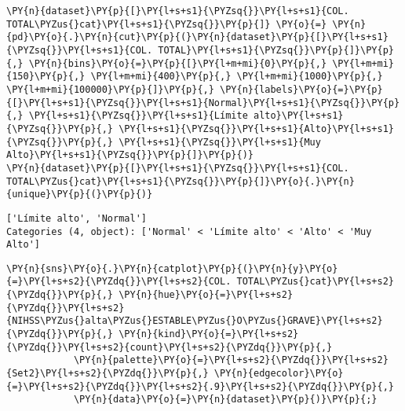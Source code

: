     \begin{tcolorbox}[breakable, size=fbox, boxrule=1pt, pad at break*=1mm,colback=cellbackground, colframe=cellborder]
\begin{Verbatim}[commandchars=\\\{\}]
\PY{n}{dataset}\PY{p}{[}\PY{l+s+s1}{\PYZsq{}}\PY{l+s+s1}{COL. TOTAL\PYZus{}cat}\PY{l+s+s1}{\PYZsq{}}\PY{p}{]} \PY{o}{=} \PY{n}{pd}\PY{o}{.}\PY{n}{cut}\PY{p}{(}\PY{n}{dataset}\PY{p}{[}\PY{l+s+s1}{\PYZsq{}}\PY{l+s+s1}{COL. TOTAL}\PY{l+s+s1}{\PYZsq{}}\PY{p}{]}\PY{p}{,} \PY{n}{bins}\PY{o}{=}\PY{p}{[}\PY{l+m+mi}{0}\PY{p}{,} \PY{l+m+mi}{150}\PY{p}{,} \PY{l+m+mi}{400}\PY{p}{,} \PY{l+m+mi}{1000}\PY{p}{,} \PY{l+m+mi}{100000}\PY{p}{]}\PY{p}{,} \PY{n}{labels}\PY{o}{=}\PY{p}{[}\PY{l+s+s1}{\PYZsq{}}\PY{l+s+s1}{Normal}\PY{l+s+s1}{\PYZsq{}}\PY{p}{,} \PY{l+s+s1}{\PYZsq{}}\PY{l+s+s1}{Límite alto}\PY{l+s+s1}{\PYZsq{}}\PY{p}{,} \PY{l+s+s1}{\PYZsq{}}\PY{l+s+s1}{Alto}\PY{l+s+s1}{\PYZsq{}}\PY{p}{,} \PY{l+s+s1}{\PYZsq{}}\PY{l+s+s1}{Muy Alto}\PY{l+s+s1}{\PYZsq{}}\PY{p}{]}\PY{p}{)}
\PY{n}{dataset}\PY{p}{[}\PY{l+s+s1}{\PYZsq{}}\PY{l+s+s1}{COL. TOTAL\PYZus{}cat}\PY{l+s+s1}{\PYZsq{}}\PY{p}{]}\PY{o}{.}\PY{n}{unique}\PY{p}{(}\PY{p}{)}
\end{Verbatim}
\end{tcolorbox}

            \begin{tcolorbox}[breakable, size=fbox, boxrule=.5pt, pad at break*=1mm, opacityfill=0]
\begin{Verbatim}[commandchars=\\\{\}]
['Límite alto', 'Normal']
Categories (4, object): ['Normal' < 'Límite alto' < 'Alto' < 'Muy Alto']
\end{Verbatim}
\end{tcolorbox}
        
    \begin{tcolorbox}[breakable, size=fbox, boxrule=1pt, pad at break*=1mm,colback=cellbackground, colframe=cellborder]
\begin{Verbatim}[commandchars=\\\{\}]
\PY{n}{sns}\PY{o}{.}\PY{n}{catplot}\PY{p}{(}\PY{n}{y}\PY{o}{=}\PY{l+s+s2}{\PYZdq{}}\PY{l+s+s2}{COL. TOTAL\PYZus{}cat}\PY{l+s+s2}{\PYZdq{}}\PY{p}{,} \PY{n}{hue}\PY{o}{=}\PY{l+s+s2}{\PYZdq{}}\PY{l+s+s2}{NIHSS\PYZus{}alta\PYZus{}ESTABLE\PYZus{}O\PYZus{}GRAVE}\PY{l+s+s2}{\PYZdq{}}\PY{p}{,} \PY{n}{kind}\PY{o}{=}\PY{l+s+s2}{\PYZdq{}}\PY{l+s+s2}{count}\PY{l+s+s2}{\PYZdq{}}\PY{p}{,}
            \PY{n}{palette}\PY{o}{=}\PY{l+s+s2}{\PYZdq{}}\PY{l+s+s2}{Set2}\PY{l+s+s2}{\PYZdq{}}\PY{p}{,} \PY{n}{edgecolor}\PY{o}{=}\PY{l+s+s2}{\PYZdq{}}\PY{l+s+s2}{.9}\PY{l+s+s2}{\PYZdq{}}\PY{p}{,}
            \PY{n}{data}\PY{o}{=}\PY{n}{dataset}\PY{p}{)}\PY{p}{;}
\end{Verbatim}
\end{tcolorbox}

